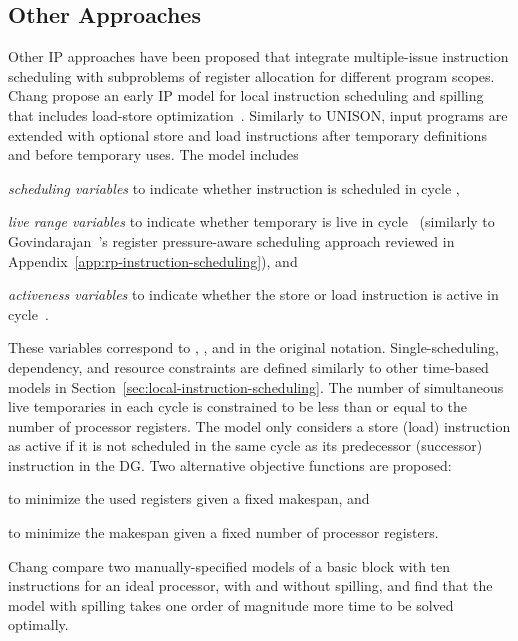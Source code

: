 \documentclass[acmsmall,authorversion,nonacm]{acmart}
\newcommand{\var}[2]{}
\begin{document}
\subsection{Other Approaches}\label{sec:other-integrated}
Other IP approaches have been proposed that integrate multiple-issue
instruction scheduling with subproblems of register allocation for
different program scopes.
Chang \etal{} propose an early IP model for local instruction
scheduling and spilling that includes load-store
optimization~\cite{Chang1997}.
Similarly to UNISON, input programs are extended with optional store
and load instructions after temporary definitions and before temporary
uses.
The model includes
\begin{inparaitem}[]
\item \emph{scheduling variables} \var{s}{i,k} to indicate whether
  instruction  is scheduled in cycle ,
\item \emph{live range variables} \var{l}{t,k} to indicate whether
  temporary  is live in cycle~ (similarly to
  Govindarajan~\etal{}'s register pressure-aware scheduling approach
  reviewed in Appendix~\ref{app:rp-instruction-scheduling}), and
\item \emph{activeness variables} \var{a}{i,k} to indicate whether the
  store or load instruction  is active in cycle~.
\end{inparaitem}
These variables correspond to , , and  in
the original notation.
Single-scheduling, dependency, and resource constraints are defined
similarly to other time-based models in
Section~\ref{sec:local-instruction-scheduling}.
The number of simultaneous live temporaries in each cycle is
constrained to be less than or equal to the number of processor
registers.
The model only considers a store (load) instruction as active if it is
not scheduled in the same cycle as its predecessor (successor)
instruction in the DG.
Two alternative objective functions are proposed:
\begin{inparaitem}[]
\item to minimize the used registers given a fixed makespan, and
\item to minimize the makespan given a fixed number of processor
  registers.
\end{inparaitem}
Chang \etal{} compare two manually-specified models of a basic block
with ten instructions for an ideal processor, with and without
spilling, and find that the model with spilling takes one order of
magnitude more time to be solved optimally.
\end{document}
